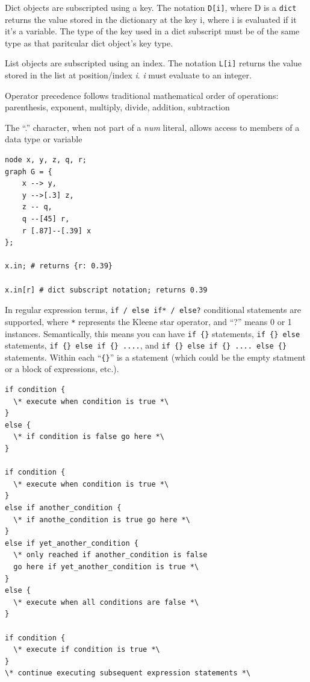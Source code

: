 \documentclass{article}
\newcommand{\code}[1]{\texttt{#1}} %
\begin{document}
Dict objects are subscripted using a key. The notation \code{D[i]}, where D is a \code{dict} returns the value stored in the dictionary at the key i, where i is evaluated if it it's a variable. The type of the key used in a dict subscript must be of the same type as that paritcular dict object's key type.

List objects are subscripted using an index. The notation \code{L[i]} returns the value stored in the list at position/index \emph{i}. \emph{i} must evaluate to an integer. 



Operator precedence follows traditional mathematical order of operations: parenthesis, exponent, multiply, divide, addition, subtraction

 The ``.'' character, when not part of a \emph{num} literal, allows access to members of a data type or variable

\begin{lstlisting}[language=pltLang, label=lst:member-access]
node x, y, z, q, r;
graph G = {
    x --> y,
    y -->[.3] z,
    z -- q,
    q --[45] r,
    r [.87]--[.39] x
};

x.in; # returns {r: 0.39}

x.in[r] # dict subscript notation; returns 0.39

\end{lstlisting}

In regular expression terms, \code{if / else if* / else?} conditional statements are supported, where \code{*} represents the Kleene star operator, and ``?'' means 0 or 1 instances. Semantically, this means you can have \code{if \{\}} statements, \code{if \{\} else} statements, \code{if \{\} else if \{\} ....}, and \code{if \{\} else if \{\} .... else \{\}} statements. Within each ``\code{\{\}}'' is a statement (which could be the empty statment or a block of expressions, etc.).

\begin{lstlisting}[language=pltLang, label=lst:if-else]
if condition {
  \* execute when condition is true *\
}
else {
  \* if condition is false go here *\
}

if condition {
  \* execute when condition is true *\
}
else if another_condition {
  \* if anothe_condition is true go here *\
}
else if yet_another_condition {
  \* only reached if another_condition is false
  go here if yet_another_condition is true *\
}
else {
  \* execute when all conditions are false *\
}

if condition {
  \* execute if condition is true *\
}
\* continue executing subsequent expression statements *\

\end{lstlisting}
\end{document}
